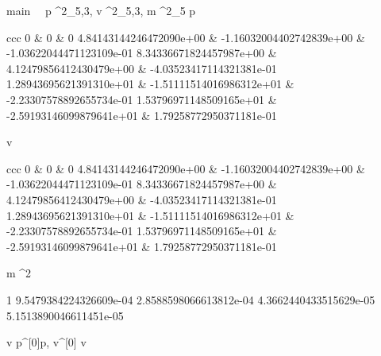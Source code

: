 \documentclass[12pt,a4paper]{book}
\begin{document}
\begin{eqcode}{main}{\ }{\ }{}
    p \in {}^2_{5,3},
    v \in {}^2_{5,3},
    m \in {}^2_{5} \lend
    p \gets \begin{tmatrix}{ccc}
            0 & 0 & 0 \lend
            4.84143144246472090e+00 & -1.16032004402742839e+00 &
            -1.03622044471123109e-01 \lend
            8.34336671824457987e+00 & 4.12479856412430479e+00 &
            -4.03523417114321381e-01 \lend
            1.28943695621391310e+01 & -1.51111514016986312e+01 &
            -2.23307578892655734e-01 \lend
            1.53796971148509165e+01 & -2.59193146099879641e+01 &
            1.79258772950371181e-01 \lend 
        \end{tmatrix} \lend
    v  \cdot
        \begin{tmatrix}{ccc}
            0 & 0 & 0 \lend
            4.84143144246472090e+00 & -1.16032004402742839e+00 &
            -1.03622044471123109e-01 \lend
            8.34336671824457987e+00 & 4.12479856412430479e+00 &
            -4.03523417114321381e-01 \lend
            1.28943695621391310e+01 & -1.51111514016986312e+01 &
            -2.23307578892655734e-01 \lend
            1.53796971148509165e+01 & -2.59193146099879641e+01 &
            1.79258772950371181e-01 \lend 
        \end{tmatrix} \lend
    m  \cdot \pi^2 \cdot 
        \begin{tvector}
            1 \lend
            9.5479384224326609e-04 \lend
            2.8588598066613812e-04 \lend
            4.3662440433515629e-05 \lend
            5.1513890046611451e-05 \lend
        \end{tvector} \lend
    v \gets {} \lend
    p^{[0]}\gets p, v^{[0]} \gets v \lend
     \lend
\end{eqcode}
\end{document}
